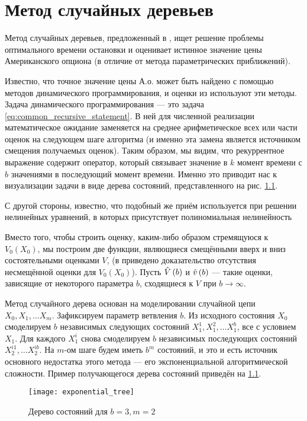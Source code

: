 \chapter{Метод случайных деревьев}\label{chapter:2}

Метод случайных деревьев, предложенный в \cite{Broadie1997}, ищет решение проблемы оптимального времени остановки и оценивает истинное значение цены Американского опциона (в отличие от метода параметрических приближений).

Известно, что точное значение цены А.о. может быть найдено с помощью методов динамического программирования, и оценки из \cite{Broadie1997} используют эти методы. Задача динамического программирования --- это задача \eqref{eq:common_recursive_statement}. В ней для численной реализации математическое ожидание заменяется на среднее арифметическое всех или части оценок на следующем шаге алгоритма (и именно эта замена является источником смещения получаемых оценок). Таким образом, мы видим, что рекуррентное выражение содержит оператор, который связывает значение в $k$ момент времени с $b$ значениями в последующий момент времени. Именно это приводит нас к визуализации задачи в виде дерева состояний, представленного на рис. \ref{fig:exponential_tree}.

С другой стороны, известно, что подобный же приём используется при решении нелинейных уравнений, в которых присутствует полиномиальная нелинейность

\par Вместо того, чтобы строить оценку, каким-либо образом стремящуюся к $V_0\left(X_0\right)$, мы построим две функции, являющиеся смещёнными вверх и вниз состоятельными оценками $V$, (в \cite{Broadie1997} приведено доказательство отсутствия несмещённой оценки для $V_0\left(X_0\right)$). Пусть $\hat{V}\left(b\right)$ и $\hat{v}\left(b\right)$ --- такие оценки, зависящие от некоторого параметра $b$, сходящиеся к $V$ при $b\to\infty$.
\par Метод случайного дерева основан на моделировании случайной цепи $X_0, X_1, \ldots X_m$. Зафиксируем параметр ветвления $b$. Из исходного состояния $X_0$ смоделируем $b$ независимых следующих состояний $X_1^1, X_1^2, \ldots X_1^b$, все с условием $X_1$. Для каждого $X_1^i$ снова смоделируем $b$ независимых последующих состояний $X_2^{i1}, \ldots X_2^{ib}$. На $m$-ом шаге будем иметь $b^m$ состояний, и это и есть источник основного недостатка этого метода --- его экспоненциальной алгоритмической сложности. Пример получающегося дерева состояний приведён на \ref{fig:exponential_tree}.
\begin{figure}
	\centering
	\texttt{[image: exponential\_tree]}
	\caption{Дерево состояний для $b = 3, m = 2$}
	\label{fig:exponential_tree}
\end{figure}
